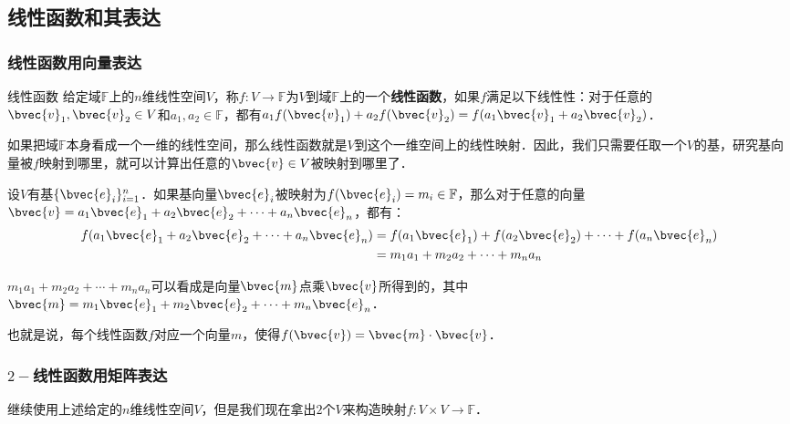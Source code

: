 

\subsection{线性函数和其表达}
\subsubsection{线性函数用向量表达}
\begin{definition}{线性函数}
给定域$\mathbb{F}$上的$n$维线性空间$V$，称$f:V\rightarrow \mathbb{F}$为$V$到域$\mathbb{F}$上的一个\textbf{线性函数}，如果$f$满足以下线性性：对于任意的$\bvec{v}_1, \bvec{v}_2\in V$和$a_1, a_2\in\mathbb{F}$，都有$a_1f(\bvec{v}_1)+a_2f(\bvec{v}_2)=f(a_1\bvec{v}_1+a_2\bvec{v}_2)$．
\end{definition}

如果把域$\mathbb{F}$本身看成一个一维的线性空间，那么线性函数就是$V$到这个一维空间上的线性映射．因此，我们只需要任取一个$V$的基，研究基向量被$f$映射到哪里，就可以计算出任意的$\bvec{v}\in V$被映射到哪里了．

设$V$有基$\{\bvec{e}_i\}_{i=1}^n$．如果基向量$\bvec{e}_i$被映射为$f(\bvec{e}_i)=m_i\in\mathbb{F}$，那么对于任意的向量$\bvec{v}=a_1\bvec{e}_1+a_2\bvec{e}_2+\cdots+a_n\bvec{e}_n$，都有：
\begin{equation}
\begin{aligned}
f(a_1\bvec{e}_1+a_2\bvec{e}_2+\cdots+a_n\bvec{e}_n)&=f(a_1\bvec{e}_1)+f(a_2\bvec{e}_2)+\cdots+f(a_n\bvec{e}_n)\\&=m_1a_1+m_2a_2+\cdots+m_na_n
\end{aligned}
\end{equation}

$m_1a_1+m_2a_2+\cdots+m_na_n$可以看成是向量$\bvec{m}$点乘$\bvec{v}$所得到的，其中$\bvec{m}=m_1\bvec{e}_1+m_2\bvec{e}_2+\cdots+m_n\bvec{e}_n$．

也就是说，每个线性函数$f$对应一个向量$m$，使得$f(\bvec{v})=\bvec{m}\cdot\bvec{v}$．

\subsubsection{$2-$线性函数用矩阵表达}

继续使用上述给定的$n$维线性空间$V$，但是我们现在拿出$2$个$V$来构造映射$f:V\times V\rightarrow\mathbb{F}$．

